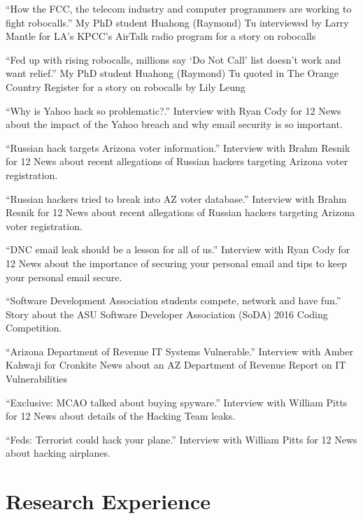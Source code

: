 \documentclass[11pt,letterpaper,sans]{moderncv}
\begin{document}
 {``How the FCC, the telecom industry and
  computer programmers are working to fight robocalls.'' My PhD
  student Huahong (Raymond) Tu interviewed by Larry Mantle for LA’s KPCC’s AirTalk radio program for a story on robocalls}

 {``Fed up with rising robocalls, millions
  say ‘Do Not Call’ list doesn’t work and want relief.'' My PhD
  student Huahong (Raymond) Tu quoted in The Orange Country Register for a story on robocalls by Lily Leung}

 {``Why is Yahoo hack so problematic?.'' Interview with Ryan Cody for 12 News about the impact of the Yahoo breach and why email security is so important.}

 {``Russian hack targets Arizona voter
  information.'' Interview with Brahm Resnik for 12 News about recent allegations of Russian hackers targeting Arizona voter registration.}

 {``Russian hackers tried to break into AZ
  voter database.'' Interview with Brahm Resnik for 12 News about recent allegations of Russian hackers targeting Arizona voter registration.}

 {``DNC email leak should be a lesson for all
  of us.'' Interview with Ryan Cody for 12 News about the importance of securing your personal email and tips to keep your personal email secure.}

 {``Software Development Association students
  compete, network and have fun.'' Story about the ASU Software Developer Association (SoDA) 2016 Coding Competition.}

 {``Arizona Department of Revenue IT Systems
  Vulnerable.'' Interview with Amber Kahwaji for Cronkite News about an AZ Department of Revenue Report on IT Vulnerabilities}

 {``Exclusive: MCAO talked about buying
  spyware.'' Interview with William Pitts for 12 News about details of the Hacking Team leaks.}

 {``Feds: Terrorist could hack your plane.'' Interview with William Pitts for 12 News about hacking airplanes.}



\section{Research Experience}
\end{document}
